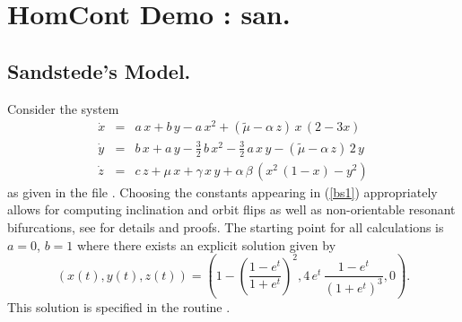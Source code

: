 \documentclass[12pt]{report}
\begin{document}
\chapter{ {\cal HomCont} Demo : san.} \label{ch:HomCont_san}

\section{ Sandstede's Model.}
\newcommand{\ti}{\tilde}
Consider the system \cite{Sa:95b}
\begin{equation} \label{bs1} \begin{array}{rcl}
\dot{x} & = & a \, x + b \, y - a \, x^2 + (\ti \mu - \alpha \, z) \, x
\, (2-3x) \\
\dot{y} & = & b \, x + a \, y - \frac{3}{2} \, b \, x^2 - 
\frac{3}{2} \, a \, x \, y - (\ti \mu - \alpha \, z) \, 2 \, y \\
\dot{z} & = & c \, z + \mu \, x + \gamma\, x\, y + \alpha \, 
\beta \, (x^2 \, (1-x) - y^2)
%
\end{array} \end{equation}
as given in the file .
Choosing the constants appearing
in (\ref{bs1}) appropriately allows for computing inclination and
orbit flips as well as non-orientable resonant bifurcations, see
\cite{Sa:95b} for details and proofs. The starting point for all
calculations is $a=0$, $b=1$ where there exists an explicit solution
given by  
$$ 
(x(t),y(t),z(t)) = 
\left( 1 - \left(\frac{1-e^t}{1+e^t}\right)^2 , 4 \, e^t \,
\frac{1-e^t}{(1+e^t)^3} , 0 \right). 
$$
This solution is specified in the routine .
\end{document}
